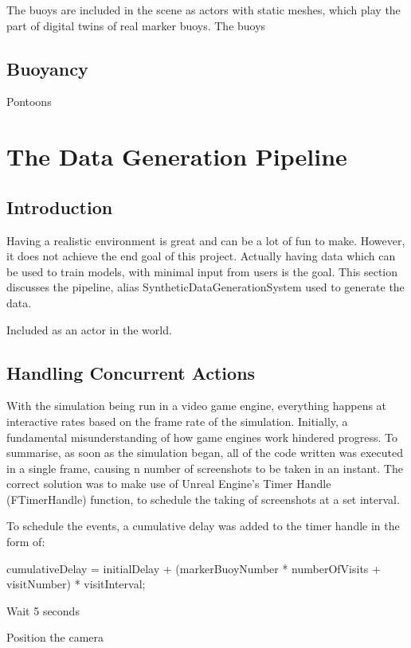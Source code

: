\documentclass[10pt,twocolumn,letterpaper]{article}
\begin{document}
The buoys are included in the scene as actors with static meshes, which play the part of digital twins of real marker buoys. The buoys 

\subsection{Buoyancy}

Pontoons

\section{The Data Generation Pipeline}

\subsection{Introduction}

Having a realistic environment is great and can be a lot of fun to make. However, it does not achieve the end goal of this project. Actually having data which can be used to train models, with minimal input from users is the goal. This section discusses the pipeline, alias SyntheticDataGenerationSystem used to generate the data.

Included as an actor in the world. 

\subsection{Handling Concurrent Actions} \label {sec:handling_concurrent_actions}

With the simulation being run in a video game engine, everything happens at interactive rates based on the frame rate of the simulation. Initially, a fundamental misunderstanding of how game engines work hindered progress. To summarise, as soon as the simulation began, all of the code written was executed in a single frame, causing n number of screenshots to be taken in an instant. The correct solution was to make use of Unreal Engine's Timer Handle (FTimerHandle) function, to schedule the taking of screenshots at a set interval.

To schedule the events, a cumulative delay was added to the timer handle in the form of:

cumulativeDelay = initialDelay + (markerBuoyNumber * numberOfVisits + visitNumber) * visitInterval;

Wait 5 seconds 

Position the camera
\end{document}
